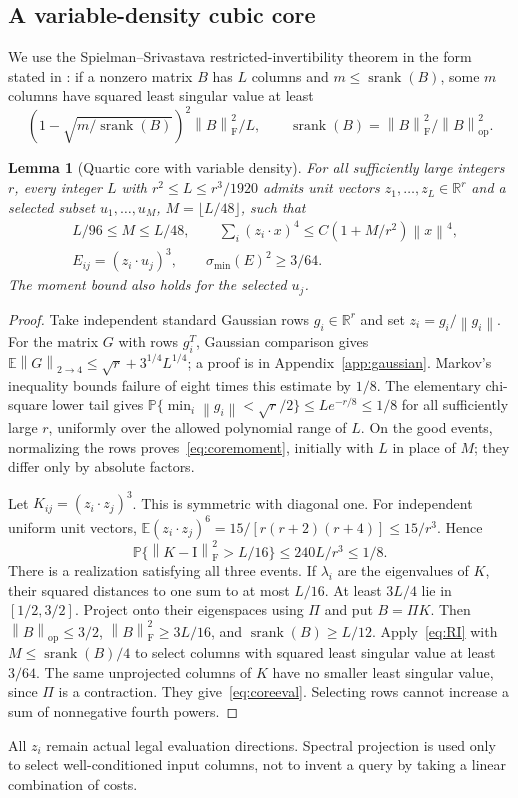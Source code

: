 \documentclass[11pt]{article}
\newtheorem{lemma}[theorem]{Lemma}
\theoremstyle{remark}\newtheorem{remark}[theorem]{Remark}
\newcommand{\R}{\mathbb R}\newcommand{\E}{\mathbb E}\newcommand{\Prob}{\mathbb P}
\newcommand{\op}{\mathrm{op}}\newcommand{\Frob}{\mathrm F}
\newcommand{\norm}[1]{\left\lVert#1\right\rVert}\newcommand{\abs}[1]{\left|#1\right|}
\newcommand{\Id}{\mathrm I}\newcommand{\dbar}{\bar d}
\DeclareMathOperator{\srank}{srank}
\numberwithin{equation}{section}
\begin{document}
\subsection{A variable-density cubic core}
We use the Spielman--Srivastava restricted-invertibility theorem in the form stated in \cite[Theorem 1.1]{mss}: if a nonzero matrix $B$ has $L$ columns and $m\le\srank(B)$, some $m$ columns have squared least singular value at least
\begin{equation}\label{eq:RI}
 \left(1-\sqrt{m/\srank(B)}\right)^2\norm B_\Frob^2/L,
 \qquad\srank(B)=\norm B_\Frob^2/\norm B_\op^2.
\end{equation}
\begin{lemma}[Quartic core with variable density]\label{lem:core}
For all sufficiently large integers $r$, every integer $L$ with
$r^2\le L\le r^3/1920$ admits unit vectors $z_1,\ldots,z_L\in\R^r$ and a selected subset $u_1,\ldots,u_M$, $M=\lfloor L/48\rfloor$, such that
\begin{align}
 &L/96\le M\le L/48,\qquad
 \sum_i(z_i\cdot x)^4\le C(1+M/r^2)\norm x^4,\label{eq:coremoment}\\
 &E_{ij}=(z_i\cdot u_j)^3,\qquad\sigma_{\min}(E)^2\ge3/64.\label{eq:coreeval}
\end{align}
The moment bound also holds for the selected $u_j$.
\end{lemma}
\begin{proof}
Take independent standard Gaussian rows $g_i\in\R^r$ and set $z_i=g_i/\norm{g_i}$. For the matrix $G$ with rows $g_i^T$, Gaussian comparison gives
$\E\norm G_{2\to4}\le\sqrt r+3^{1/4}L^{1/4}$; a proof is in Appendix~\ref{app:gaussian}. Markov's inequality bounds failure of eight times this estimate by $1/8$. The elementary chi-square lower tail gives
$\Prob\{\min_i\norm{g_i}<\sqrt r/2\}\le Le^{-r/8}\le1/8$ for all sufficiently large $r$, uniformly over the allowed polynomial range of $L$. On the good events, normalizing the rows proves~\eqref{eq:coremoment}, initially with $L$ in place of $M$; they differ only by absolute factors.

Let $K_{ij}=(z_i\cdot z_j)^3$. This is symmetric with diagonal one. For independent uniform unit vectors,
$\E(z_i\cdot z_j)^6=15/[r(r+2)(r+4)]\le15/r^3$. Hence
\[
 \Prob\{\norm{K-\Id}_\Frob^2>L/16\}
 \le240L/r^3\le1/8.
\]
There is a realization satisfying all three events. If $\lambda_i$ are the eigenvalues of $K$, their squared distances to one sum to at most $L/16$. At least $3L/4$ lie in $[1/2,3/2]$. Project onto their eigenspaces using $\Pi$ and put $B=\Pi K$. Then $\norm B_\op\le3/2$, $\norm B_\Frob^2\ge3L/16$, and $\srank(B)\ge L/12$. Apply~\eqref{eq:RI} with $M\le\srank(B)/4$ to select columns with squared least singular value at least $3/64$. The same unprojected columns of $K$ have no smaller least singular value, since $\Pi$ is a contraction. They give~\eqref{eq:coreeval}. Selecting rows cannot increase a sum of nonnegative fourth powers.
\end{proof}
All $z_i$ remain actual legal evaluation directions. Spectral projection is used only to select well-conditioned input columns, not to invent a query by taking a linear combination of costs.
\end{document}
